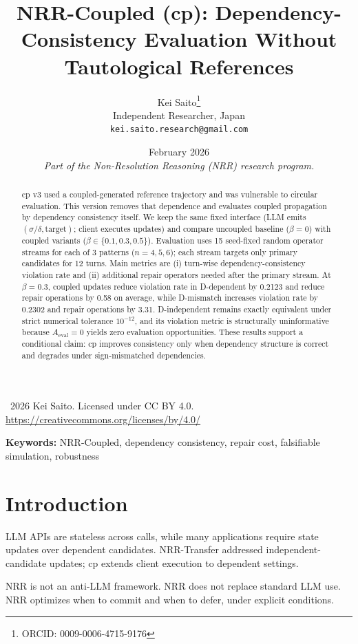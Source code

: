 \documentclass[11pt,a4paper]{article}
\title{\textbf{NRR-Coupled (cp): Dependency-Consistency Evaluation Without Tautological References}}
\author{Kei Saito\thanks{ORCID: 0009-0006-4715-9176}\\Independent Researcher, Japan\\\texttt{kei.saito.research@gmail.com}}
\date{February 2026\\[0.5em]\textit{Part of the Non-Resolution Reasoning (NRR) research program.}}
\begin{document}
\maketitle

\begin{center}
\textcopyright\ 2026 Kei Saito. Licensed under CC BY 4.0.\\
\url{https://creativecommons.org/licenses/by/4.0/}
\end{center}

\begin{abstract}
cp v3 used a coupled-generated reference trajectory and was vulnerable to circular evaluation. This version removes that dependence and evaluates coupled propagation by dependency consistency itself. We keep the same fixed interface (LLM emits \((\sigma/\delta,\text{target})\); client executes updates) and compare uncoupled baseline (\(\beta=0\)) with coupled variants (\(\beta\in\{0.1,0.3,0.5\}\)). Evaluation uses 15 seed-fixed random operator streams for each of 3 patterns (\(n=4,5,6\)); each stream targets only primary candidates for 12 turns. Main metrics are (i) turn-wise dependency-consistency violation rate and (ii) additional repair operators needed after the primary stream. At \(\beta=0.3\), coupled updates reduce violation rate in D-dependent by 0.2123 and reduce repair operations by 0.58 on average, while D-mismatch increases violation rate by 0.2302 and repair operations by 3.31. D-independent remains exactly equivalent under strict numerical tolerance \(10^{-12}\), and its violation metric is structurally uninformative because \(A_{\text{eval}}=0\) yields zero evaluation opportunities. These results support a conditional claim: cp improves consistency only when dependency structure is correct and degrades under sign-mismatched dependencies.
\end{abstract}

\noindent\textbf{Keywords:} NRR-Coupled, dependency consistency, repair cost, falsifiable simulation, robustness

\section{Introduction}
LLM APIs are stateless across calls, while many applications require state updates over dependent candidates. NRR-Transfer addressed independent-candidate updates; cp extends client execution to dependent settings.

NRR is not an anti-LLM framework.
NRR does not replace standard LLM use.
NRR optimizes when to commit and when to defer, under explicit conditions.
\end{document}
